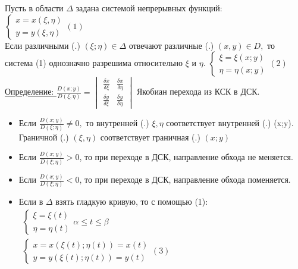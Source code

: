 \documentclass[12pt]{article}
\begin{document}
  \vspace{1em}
  \par
  Пусть в области $\Delta$ задана системой непрерывных функций:
  $\begin{cases}
    x=x(\xi,\eta)\\
    y=y(\xi,\eta)
  \end{cases} (1)$\\
  Если различными (.) $(\xi;\eta) \in \Delta$ отвечают различные (.) $(x,y) \in D,$ то система (1)
  однозначно разрешима относительно $\xi$ и $\eta$.
  $\begin{cases}
    \xi=\xi(x;y)\\
    \eta=\eta(x;y)
  \end{cases} (2)$\\
  \underline{Определение: } $\frac{D(x;y)}{D(\xi,\eta)}=
  \begin{vmatrix}
    \frac{\delta x}{\delta \xi} & \frac{\delta x}{\delta \eta}\\
    \frac{\delta y}{\delta \xi} & \frac{\delta y}{\delta \eta}
  \end{vmatrix}$ Якобиан перехода из КСК в ДСК.\\
  \begin{itemize}
    \item Если $\frac{D(x;y)}{D(\xi;\eta)} \not = 0,$ то внутренней (.) $\xi,\eta$ соответствует
    внутренней (.) (x;y).\\Граничной (.) $(\xi,\eta)$ соответствует граничная (.) $(x;y)$
    \item Если $\frac{D(x;y)}{D(\xi;\eta)} > 0$, то при переходе в ДСК, направление обхода не меняется.
    \item Если $\frac{D(x;y)}{D(\xi;\eta)} < 0$, то при переходе в ДСК, направление обхода поменяется.
    \item Если в $\Delta$ взять гладкую кривую, то с помощью (1):
    $\begin{matrix}
        \begin{cases}
          \xi=\xi(t)\\
          \eta=\eta(t)
        \end{cases} \alpha\leq t\leq\beta\\
        \begin{cases}
          x=x(\xi(t);\eta(t))=x(t)\\
          y=y(\xi(t);\eta(t))=y(t)
        \end{cases} (3)
      \end{matrix}$
  \end{itemize}
\end{document}
